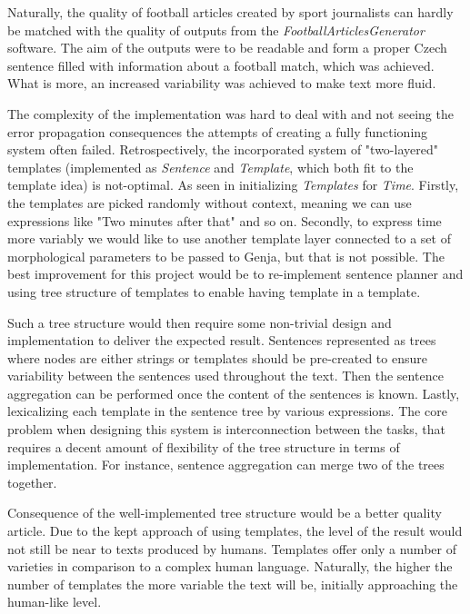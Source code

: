 Naturally, the quality of football articles created by sport journalists can hardly be matched with the quality of outputs from the \textit{FootballArticlesGenerator} software. The aim of the outputs were to be readable and form a proper Czech sentence filled with information about a football match, which was achieved. What is more, an increased variability was achieved to make text more fluid.

The complexity of the implementation was hard to deal with and not seeing the error propagation consequences the attempts of creating a fully functioning system often failed. Retrospectively, the incorporated system of "two-layered" templates (implemented as \textit{Sentence} and \textit{Template}, which both fit to the template idea) is not-optimal. As seen in initializing \textit{Templates} for \textit{Time}. Firstly, the templates are picked randomly without context, meaning we can use expressions like "Two minutes after that" and so on. Secondly, to express time more variably we would like to use another template layer connected to a set of morphological parameters to be passed to Genja, but that is not possible. The best improvement for this project would be to re-implement sentence planner and using tree structure of templates to enable having template in a template. 

Such a tree structure would then require some non-trivial design and implementation to deliver the expected result. Sentences represented as trees where nodes are either strings or templates should be pre-created  to ensure variability between the sentences used throughout the text. Then the sentence aggregation can be performed once the content of the sentences is known. Lastly, lexicalizing each template in the sentence tree by various expressions. The core problem when designing this system is interconnection between the tasks, that requires a decent amount of flexibility of the tree structure in terms of implementation. For instance, sentence aggregation can merge two of the trees together.

Consequence of the well-implemented tree structure would be a better quality article. Due to the kept approach of using templates, the level of the result would not still be near to texts produced by humans. Templates offer only a number of varieties in comparison to a complex human language. Naturally, the higher the number of templates the more variable the text will be, initially approaching the human-like level. 

